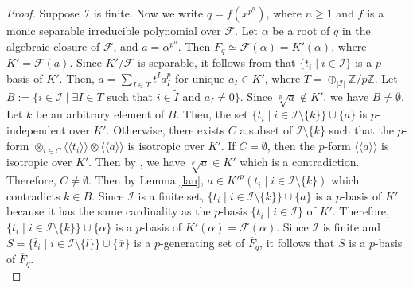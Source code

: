 \documentclass[times,10pt]{amsart}
\newcommand{\Z}{\ensuremath{\mathbb{Z}}}
\newcommand{\F}{\ensuremath{\mathcal{F}}}
\newcommand{\I}{\ensuremath{\mathcal{I}}}
\renewcommand{\cong}{\simeq}
\begin{document}
\begin{proof}
  Suppose $\I$ is finite.
    Now we write $q= f(x^{p^n})$, where $n\geq 1$ and  $f$ is a monic separable irreducible polynomial over $\F$.   Let $\alpha$ be a root of $q$ {in the algebraic closure of $\F$}, and $a= \alpha^{p^n}$. Then $\overline{F}_q\cong \F(\alpha)= K'(\alpha)$, where $K'=\F(a)$.  Since $K'/{\F}$ is separable, it follows from \cite[Lemma 2.1]{AAB}  that $\{ t_i\mid i\in \I\}$ is a $p$-basis of $K'$.  Then, $a= \sum_{I\in T} t^I a_I^p$ for unique $a_I\in K'$, where $T= \oplus_{|\I|}\Z/p\Z $. Let $B:=\{ i\in \I\mid \exists I\in T\text{ such that }i\in \tilde{I}\text{ and } a_I\neq 0\}$. Since $\sqrt[p]{a}\notin {K'}$, we have $B\neq \emptyset$. Let $k$ be an arbitrary element of $B$.  %
     Then, the set   $\{ t_i\mid {i\in \I\setminus\{k\}}\} \cup \{ a\}$ is  $p$-independent over $K'$.  Otherwise,  {there exists $C$ a subset of $\I\setminus\{k\}$ such that} the $p$-form $\otimes_{i\in C} \langle\langle t_i\rangle\rangle\otimes \langle\langle a\rangle\rangle $ is isotropic over $K'$. If $C=\emptyset$, then the $p$-form $\langle\langle a\rangle\rangle$  is isotropic over $K'$. Then by  \cite[Corollary 4.10]{Hoffmann1}, we have $\sqrt[p]{a}\in K'$ which is a contradiction. Therefore, $C\neq \emptyset$. Then by Lemma \ref{lan},  $ a\in {K'}^p( t_i\mid {i\in \I\setminus\{k\}})$ which contradicts  $k\in B$.  Since $\I$ is a  finite set,  $\{ t_i\mid i\in \I\setminus\{k\}\} \cup \{a\}$ is a $p$-basis of $K'$ {because it has the same cardinality as the $p$-basis $\{ t_i\mid i\in \I\}$ of $K'$}. Therefore, $ \{ t_i\mid  {i\in \I\setminus\{k\}}\}\cup \{ \alpha\}$ is a $p$-basis of $K'(\alpha)=\F(\alpha)$. Since $\I$ is  finite and $S=\{ \overline{t}_i\mid {i\in \I\setminus\{l\}}\}\cup\{ \overline{x}\}$ is a $p$-generating set of $\overline{F}_q$, it follows that $S$ is a $p$-basis of $\overline{F}_q$. \\
     

\end{proof}
\end{document}
